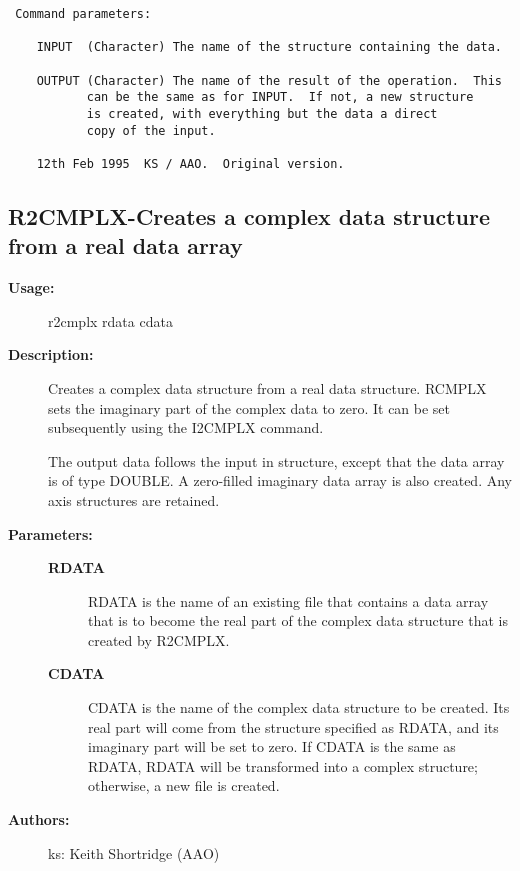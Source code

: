 \begin{description}
\begin{verbatim}
 Command parameters:

    INPUT  (Character) The name of the structure containing the data.

    OUTPUT (Character) The name of the result of the operation.  This
           can be the same as for INPUT.  If not, a new structure
           is created, with everything but the data a direct
           copy of the input.

    12th Feb 1995  KS / AAO.  Original version.
\end{verbatim}
\end{description}
\subsection{R2CMPLX-\label{R2CMPLX}Creates a complex data structure from a real data array}
\begin{description}

\item [{\bf Usage:}]
 r2cmplx rdata cdata

\item [{\bf Description:}]
 Creates a complex data structure from a real data structure.
 RCMPLX sets the imaginary part of the complex data to
 zero.  It can be set subsequently using the I2CMPLX command.

 The output data follows the input in structure, except that the
 data array is of type DOUBLE.  A zero-filled imaginary data array
 is also created. Any axis structures are retained.

\item [{\bf Parameters:}]
\begin{description}
\item [{\bf RDATA}]
 RDATA is the name of an existing file that contains a data
 array that is to become the real part of the complex data
 structure that is created by R2CMPLX.
\item [{\bf CDATA}]
 CDATA is the name of the complex data structure to be created.
 Its real part will come from the structure specified as RDATA,
 and its imaginary part will be set to zero.  If CDATA is the
 same as RDATA, RDATA will be transformed into a complex
 structure; otherwise, a new file is created.
\end{description}

\item [{\bf Authors:}]
 ks: Keith Shortridge (AAO)
\end{description}
